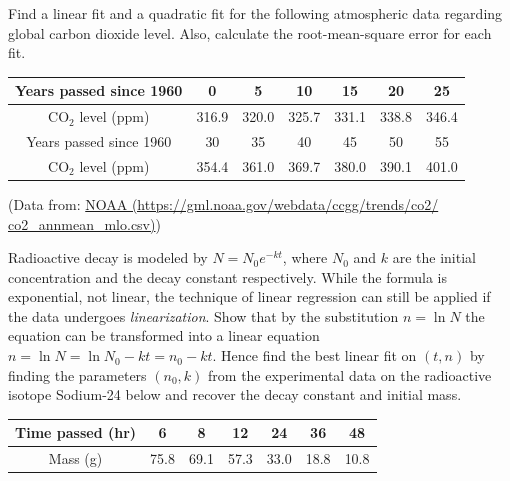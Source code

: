 \begin{Exercise}
Find a linear fit and a quadratic fit for the following atmospheric data regarding global carbon dioxide level. Also, calculate the root-mean-square error for each fit.
\begin{center}
\end{center}
\begin{center}
\begin{tabular}{|c|c|c|c|c|c|c|}
\hline
Years passed since 1960 & 0 & 5 & 10 & 15 & 20 & 25 \\
\hline
CO$_2$ level (ppm) & 316.9 & 320.0 & 325.7 & 331.1 & 338.8 & 346.4 \\
\hline
Years passed since 1960 & 30 & 35 & 40 & 45 & 50 & 55\\
\hline
CO$_2$ level (ppm) & 354.4 & 361.0 & 369.7 & 380.0 & 390.1 & 401.0\\
\hline
\end{tabular}
\end{center}
(Data from: \href{https://gml.noaa.gov/webdata/ccgg/trends/co2/co2_mm_mlo.csv}{NOAA (https://gml.noaa.gov/webdata/ccgg/trends/co2/\\co2\_annmean\_mlo.csv)})
\end{Exercise}

\begin{Exercise}
Radioactive decay is modeled by $N = N_0e^{-kt}$, where $N_0$ and $k$ are the initial concentration and the decay constant respectively. While the formula is exponential, not linear, the technique of linear regression can still be applied if the data undergoes \textit{linearization}. Show that by the substitution $n = \ln N$ the equation can be transformed into a linear equation $n = \ln N = \ln N_0 - kt = n_0 - kt$. Hence find the best linear fit on $(t, n)$ by finding the parameters $(n_0, k)$ from the experimental data on the radioactive isotope Sodium-24 below and recover the decay constant and initial mass.
\begin{center}
\begin{tabular}{|c|c|c|c|c|c|c|}
\hline
Time passed (hr) & 6 & 8 & 12 & 24 & 36 & 48\\
\hline
Mass (g) & 75.8 & 69.1 & 57.3 & 33.0 & 18.8 & 10.8\\
\hline
\end{tabular}
\end{center}
\end{Exercise}

